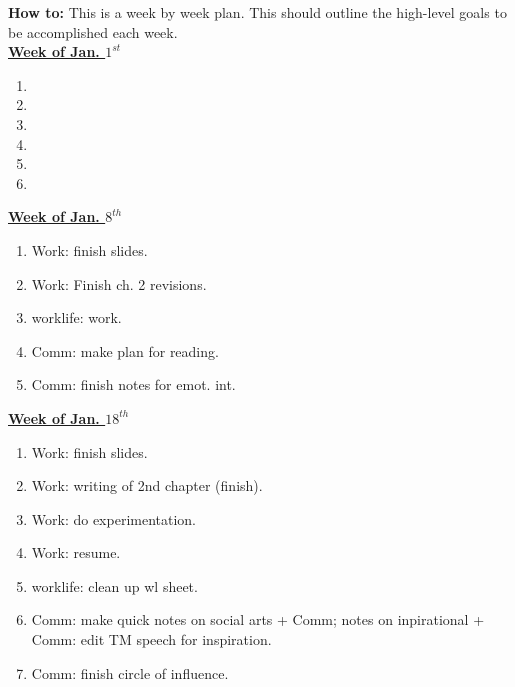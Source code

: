 \documentclass[11pt]{article}
\begin{document}
\newpage 
\textbf{How to:} This is a week by week plan. This should outline the high-level goals to be accomplished each week.  \\

           {\small \underline{\textbf{Week of Jan. $1^{st}$}}}\\
           \begin{enumerate}
             \small \item \small
           \item \small 
           \item \small
           \item \small 
           \item \small
           \item \small 
           \end{enumerate}   
           {\small \underline{\textbf{Week of Jan. $8^{th}$}}}\\
           \begin{enumerate}
           \small \item \small Work: finish slides. 
            \item \small Work: Finish ch. 2 revisions. 
            \item \small worklife: work. 
            \item \small Comm: make plan for reading. 
            \item \small Comm: finish notes for emot. int. 
           \end{enumerate}
           
           {\small \underline{\textbf{Week of Jan. $18^{th}$}} }\\
           \begin{enumerate} 
             \small \item \small Work: finish slides. 
           \item \small Work: writing of 2nd chapter (finish).
           \item \small Work: do experimentation. 
           \item \small Work: resume. 
           \item \small worklife: clean up wl sheet. 
           \item \small Comm: make quick notes on social arts + Comm; notes on inpirational + Comm: edit TM speech for inspiration. 
           \item \small Comm: finish circle of influence. 
           \end{enumerate} 
                   
\end{document}
